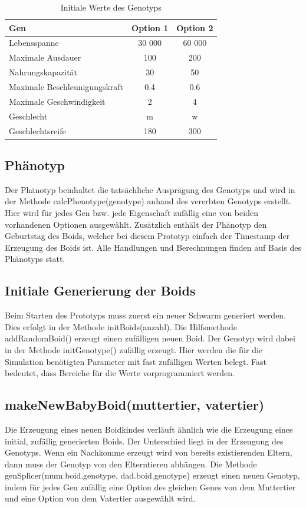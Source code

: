 \documentclass[draft=false
              ,paper=a4
              ,twoside=false
              ,fontsize=11pt
              ,headsepline
              ,BCOR10mm
              ,DIV11
              ,bibtotoc
              ,liststotoc
              ]{scrbook}
\begin{document}
\begin{table}[!h]
\centering
\begin{tabular}{l|c|c}
	Gen & Option 1 & Option 2\\
	\hline
	Lebensspanne & 30 000 & 60 000\\
	Maximale Ausdauer & 100 & 200\\
	Nahrungskapazität & 30 & 50\\
  Maximale Beschleunigungskraft & 0.4 & 0.6\\
  Maximale Geschwindigkeit & 2 & 4\\
  Geschlecht & m & w\\
  Geschlechtsreife & 180 & 300\\
\end{tabular}
\caption{Initiale Werte des Genotyps}
\label{genotyp}
\end{table}

\subsection{Phänotyp}
Der Phänotyp beinhaltet die tatsächliche Ausprägung des Genotyps und wird in der Methode calcPhenotype(genotype) anhand des vererbten Genotyps erstellt. Hier wird für jedes Gen bzw. jede Eigenschaft zufällig eine von beiden vorhandenen Optionen ausgewählt. Zusätzlich enthält der Phänotyp den Geburtstag des Boids, welcher bei diesem Prototyp einfach der Timestamp der Erzeugung des Boids ist. Alle Handlungen und Berechnungen finden auf Basis des Phänotyps statt.

\subsection{Initiale Generierung der Boids}
Beim Starten des Prototyps muss zuerst ein neuer Schwarm generiert werden. Dies erfolgt in der Methode initBoids(anzahl). Die Hilfsmethode addRandomBoid() erzeugt einen zufälligen neuen Boid. Der Genotyp wird dabei in der Methode initGenotype() zufällig erzeugt. Hier werden die für die Simulation benötigten Parameter mit fast zufälligen Werten belegt. Fast bedeutet, dass Bereiche für die Werte vorprogrammiert werden.

\subsection{makeNewBabyBoid(muttertier, vatertier)}\label{babies}
Die Erzeugung eines neuen Boidkindes verläuft ähnlich wie die Erzeugung eines initial, zufällig generierten Boids. Der Unterschied liegt in der Erzeugung des Genotyps. Wenn ein Nachkomme erzeugt wird von bereits existierenden Eltern, dann muss der Genotyp von den Elterntieren abhängen. Die Methode genSplicer(mum.boid.genotype, dad.boid.genotype) erzeugt einen neuen Genotyp, indem für jedes Gen zufällig eine Option des gleichen Genes von dem Muttertier und eine Option von dem Vatertier ausgewählt wird.
\end{document}
